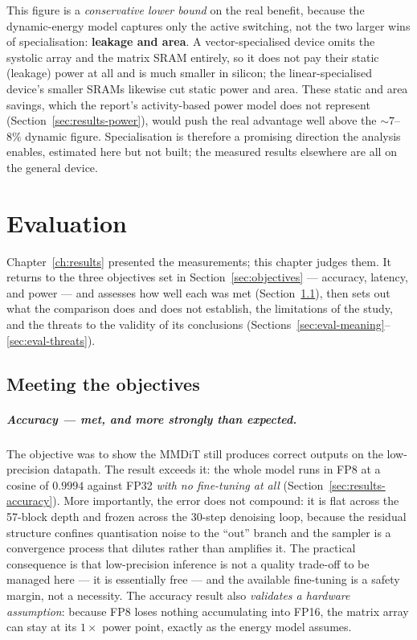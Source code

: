 \documentclass[11pt]{report}
\begin{document}
This figure is a \emph{conservative lower bound} on the real benefit, because
the dynamic-energy model captures only the active switching, not the two
larger wins of specialisation: \textbf{leakage and area}. A
vector-specialised device omits the systolic array and the matrix SRAM
entirely, so it does not pay their static (leakage) power at all and is much
smaller in silicon; the linear-specialised device's smaller SRAMs likewise
cut static power and area. These static and area savings, which the
report's activity-based power model does not represent
(Section~\ref{sec:results-power}), would push the real advantage well above
the ${\sim}7$--$8\%$ dynamic figure. Specialisation is therefore a promising
direction the analysis enables, estimated here but not built; the measured
results elsewhere are all on the general device.


\chapter{Evaluation}
\label{ch:evaluation}

Chapter~\ref{ch:results} presented the measurements; this chapter judges
them. It returns to the three objectives set in Section~\ref{sec:objectives}
--- accuracy, latency, and power --- and assesses how well each was met
(Section~\ref{sec:eval-objectives}), then sets out what the comparison does
and does not establish, the limitations of the study, and the threats to the
validity of its conclusions (Sections~\ref{sec:eval-meaning}--\ref{sec:eval-threats}).

\section{Meeting the objectives}
\label{sec:eval-objectives}

\paragraph{Accuracy --- met, and more strongly than expected.} The objective
was to show the MMDiT still produces correct outputs on the low-precision
datapath. The result exceeds it: the whole model runs in FP8 at a cosine of
$0.9994$ against FP32 \emph{with no fine-tuning at all}
(Section~\ref{sec:results-accuracy}). More importantly, the error does not
compound: it is flat across the 57-block depth and frozen across the 30-step
denoising loop, because the residual structure confines quantisation noise to
the ``out'' branch and the sampler is a convergence process that dilutes
rather than amplifies it. The practical consequence is that low-precision
inference is not a quality trade-off to be managed here --- it is essentially
free --- and the available fine-tuning is a safety margin, not a necessity.
The accuracy result also \emph{validates a hardware assumption}: because FP8
loses nothing accumulating into FP16, the matrix array can stay at its $1\times$
power point, exactly as the energy model assumes.
\end{document}
